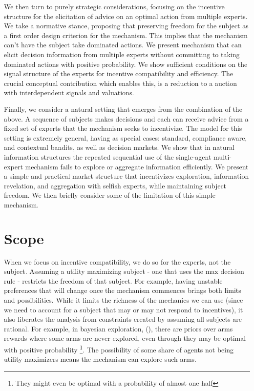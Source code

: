 We then turn to purely strategic considerations, focusing on the incentive structure for the elicitation of advice on an optimal action from multiple experts.
We take a normative stance, proposing that preserving freedom for the subject as a first order design criterion for the mechanism. This implies that the mechanism can't have the subject take dominated actions.
We present mechanism that can elicit decision information from multiple experts without committing to taking dominated actions with positive probability. We show sufficient conditions on the signal structure of the experts for incentive compatibility and efficiency.
The crucial conceptual contribution which enables this, is a reduction to a auction with interdependent signals and valuations. 


Finally, we consider a natural setting that emerges from the combination of the above. A sequence of subjects makes decisions and each can receive advice from a fixed set of experts that the mechanism seeks to incentivize.
The model for this setting is extremely general, having as special cases: standard, compliance aware, and contextual bandits, as well as decision markets.
We show that in natural information structures the repeated sequential use of the single-agent multi-expert mechanism fails to explore or aggregate information efficiently.
We present a simple and practical market structure that incentivizes exploration, information revelation, and aggregation with selfish experts, while maintaining subject freedom. We then briefly consider some of the limitation of this simple mechanism.


\section{Scope}

When we focus on incentive compatibility, we do so for the experts, not the subject.
Assuming a utility maximizing subject - one that uses the max decision rule - restricts the freedom of that subject.
For example, having unstable preferences that will change once the mechanism commences brings both limits and possibilities.
While it limits the richness of the mechanics we can use (since we need to account for a subject that may or may not respond to incentives), it also liberates the analysis from constraints created by assuming all subjects are rational.
For example, in bayesian  exploration, (\cite{mansour2015bayesian}), there are priors over arms rewards where some arms are never explored, even through they may be optimal with positive probability \footnote{They might even be optimal with a probability of almost one half}. The possibility of some share of agents not being utility maximizers means the mechanism can explore such arms.

